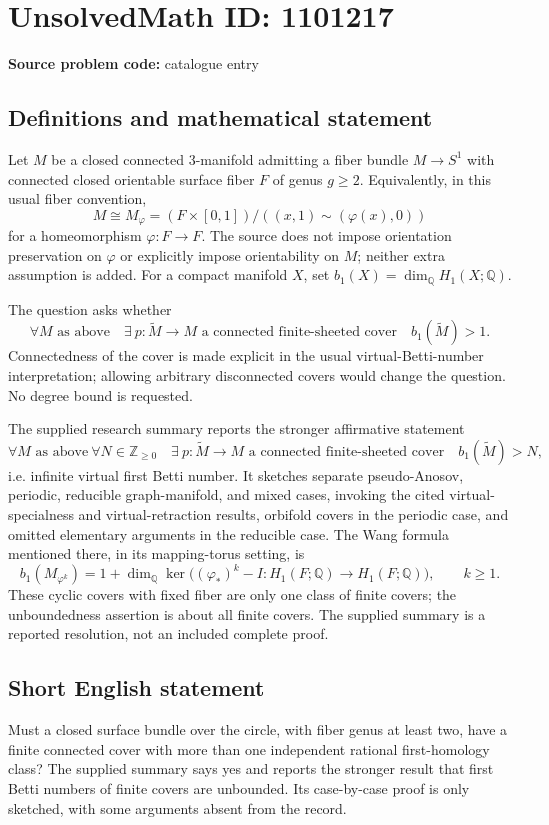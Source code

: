 \documentclass[11pt]{article}
\newcommand{\Z}{\mathbb{Z}}
\newcommand{\Q}{\mathbb{Q}}
\begin{document}
\section*{UnsolvedMath ID: 1101217}
\textbf{Source problem code:} catalogue entry
\subsection{Definitions and mathematical statement}
Let $M$ be a closed connected $3$-manifold admitting a fiber bundle $M\to S^1$ with connected closed orientable surface fiber $F$ of genus $g\ge2$. Equivalently, in this usual fiber convention,
\[
M\cong M_\varphi=(F\times[0,1])/((x,1)\sim(\varphi(x),0))
\]
for a homeomorphism $\varphi:F\to F$. The source does not impose orientation preservation on $\varphi$ or explicitly impose orientability on $M$; neither extra assumption is added. For a compact manifold $X$, set $b_1(X)=\dim_\Q H_1(X;\Q)$.

The question asks whether
\[
\forall M\text{ as above}\quad
\exists\ p:\widetilde M\to M\text{ a connected finite-sheeted cover}
\quad b_1(\widetilde M)>1.
\]
Connectedness of the cover is made explicit in the usual virtual-Betti-number interpretation; allowing arbitrary disconnected covers would change the question. No degree bound is requested.

The supplied research summary reports the stronger affirmative statement
\[
\forall M\text{ as above}\ \forall N\in\Z_{\ge0}\quad
\exists\ p:\widetilde M\to M\text{ a connected finite-sheeted cover}
\quad b_1(\widetilde M)>N,
\]
i.e. infinite virtual first Betti number. It sketches separate pseudo-Anosov, periodic, reducible graph-manifold, and mixed cases, invoking the cited virtual-specialness and virtual-retraction results, orbifold covers in the periodic case, and omitted elementary arguments in the reducible case. The Wang formula mentioned there, in its mapping-torus setting, is
\[
b_1(M_{\varphi^k})=1+\dim_\Q\ker\bigl((\varphi_*)^k-I:H_1(F;\Q)\to H_1(F;\Q)\bigr),\qquad k\ge1.
\]
These cyclic covers with fixed fiber are only one class of finite covers; the unboundedness assertion is about all finite covers. The supplied summary is a reported resolution, not an included complete proof.
\subsection{Short English statement}
Must a closed surface bundle over the circle, with fiber genus at least two, have a finite connected cover with more than one independent rational first-homology class? The supplied summary says yes and reports the stronger result that first Betti numbers of finite covers are unbounded. Its case-by-case proof is only sketched, with some arguments absent from the record.
\end{document}
